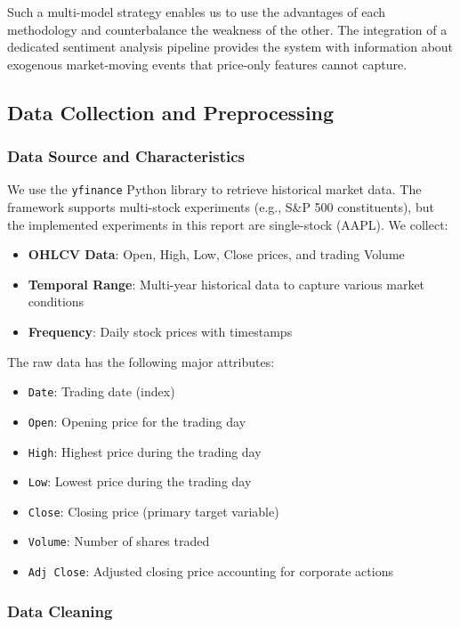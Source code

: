 \documentclass[12pt,a4paper]{article}
\begin{document}
Such a multi-model strategy enables us to use the advantages of each methodology and counterbalance the weakness of the other. The integration of a dedicated sentiment analysis pipeline provides the system with information about exogenous market-moving events that price-only features cannot capture.

\subsection{Data Collection and Preprocessing}

\subsubsection{Data Source and Characteristics}

We use the \texttt{yfinance} Python library to retrieve historical market data. The framework supports multi-stock experiments (e.g., S\&P 500 constituents), but the implemented experiments in this report are single-stock (AAPL). We collect:

\begin{itemize}
    \item \textbf{OHLCV Data}: Open, High, Low, Close prices, and trading Volume
    \item \textbf{Temporal Range}: Multi-year historical data to capture various market conditions
    \item \textbf{Frequency}: Daily stock prices with timestamps
\end{itemize}

The raw data has the following major attributes:
\begin{itemize}
    \item \texttt{Date}: Trading date (index)
    \item \texttt{Open}: Opening price for the trading day
    \item \texttt{High}: Highest price during the trading day
    \item \texttt{Low}: Lowest price during the trading day
    \item \texttt{Close}: Closing price (primary target variable)
    \item \texttt{Volume}: Number of shares traded
    \item \texttt{Adj Close}: Adjusted closing price accounting for corporate actions
\end{itemize}

\subsubsection{Data Cleaning}
\end{document}
